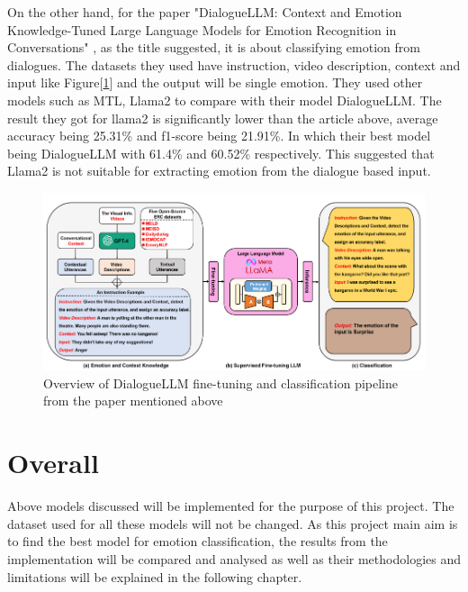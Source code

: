 On the other hand, for the paper "DialogueLLM: Context and Emotion Knowledge-Tuned Large Language Models for Emotion Recognition in Conversations" \cite{zhang2024dialoguellm}, as the title suggested, it is about classifying emotion from dialogues. The datasets they used have instruction, video description, context and input like Figure[\ref{fig:DialogueLLM}] and the output will be single emotion. They used other models such as MTL, Llama2 to compare with their model DialogueLLM. The result they got for llama2 is significantly lower than the article above, average accuracy being 25.31\% and f1-score being 21.91\%. In which their best model being DialogueLLM with 61.4\% and 60.52\% respectively. This suggested that Llama2 is not suitable for extracting emotion from the dialogue based input. 
\begin{figure}[!htb]
    \centerline{\includegraphics[scale=.68]{Figures/dialogueLLM.png}}
    \caption{Overview of DialogueLLM fine-tuning and classification pipeline from the paper mentioned above}
    \label{fig:DialogueLLM}
 \end{figure}
 
 \section{Overall}

 Above models discussed will be implemented for the purpose of this project. The dataset used for all these models will not be changed. As this project main aim is to find the best model for emotion classification, the results from the implementation will be compared and analysed as well as their methodologies and limitations will be explained in the following chapter.